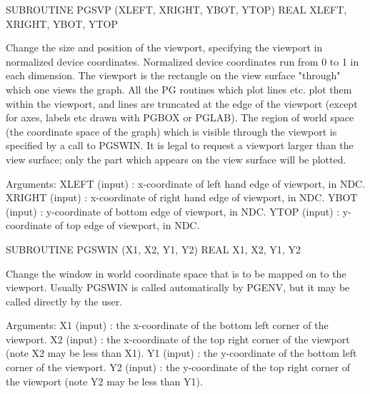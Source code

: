 {\eightpoint\begintt
      SUBROUTINE PGSVP (XLEFT, XRIGHT, YBOT, YTOP)
      REAL XLEFT, XRIGHT, YBOT, YTOP
 
Change the size and position of the viewport, specifying
the viewport in normalized device coordinates.  Normalized
device coordinates run from 0 to 1 in each dimension. The
viewport is the rectangle on the view surface "through"
which one views the graph.  All the PG routines which plot lines
etc. plot them within the viewport, and lines are truncated at
the edge of the viewport (except for axes, labels etc drawn with
PGBOX or PGLAB).  The region of world space (the coordinate
space of the graph) which is visible through the viewport is
specified by a call to PGSWIN.  It is legal to request a
viewport larger than the view surface; only the part which
appears on the view surface will be plotted.
 
Arguments:
 XLEFT  (input)  : x-coordinate of left hand edge of viewport, in NDC.
 XRIGHT (input)  : x-coordinate of right hand edge of viewport,
                   in NDC.
 YBOT   (input)  : y-coordinate of bottom edge of viewport, in NDC.
 YTOP   (input)  : y-coordinate of top  edge of viewport, in NDC.
\endtt}

{\eightpoint\begintt
      SUBROUTINE PGSWIN (X1, X2, Y1, Y2)
      REAL X1, X2, Y1, Y2
 
Change the window in world coordinate space that is to be mapped on
to the viewport.  Usually PGSWIN is called automatically by PGENV,
but it may be called directly by the user.
 
Arguments:
 X1     (input)  : the x-coordinate of the bottom left corner
                   of the viewport.
 X2     (input)  : the x-coordinate of the top right corner
                   of the viewport (note X2 may be less than X1).
 Y1     (input)  : the y-coordinate of the bottom left corner
                   of the viewport.
 Y2     (input)  : the y-coordinate of the top right corner
                   of the viewport (note Y2 may be less than Y1).
\endtt}

